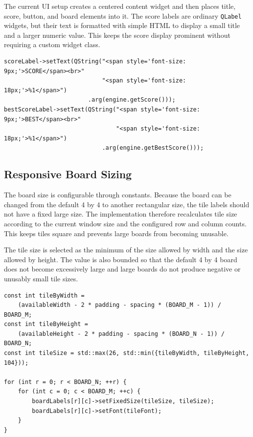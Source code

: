 \documentclass[a4paper,12pt]{article}
\begin{document}
The current UI setup creates a centered content widget and then places title, score, button, and board elements into it. The score labels are ordinary \texttt{QLabel} widgets, but their text is formatted with simple HTML to display a small title and a larger numeric value. This keeps the score display prominent without requiring a custom widget class.

\begin{lstlisting}[style=CppStyle,caption={Score label update}]
scoreLabel->setText(QString("<span style='font-size: 9px;'>SCORE</span><br>"
                            "<span style='font-size: 18px;'>%1</span>")
                        .arg(engine.getScore()));
bestScoreLabel->setText(QString("<span style='font-size: 9px;'>BEST</span><br>"
                                "<span style='font-size: 18px;'>%1</span>")
                            .arg(engine.getBestScore()));
\end{lstlisting}

\subsection*{Responsive Board Sizing}

The board size is configurable through constants. Because the board can be changed from the default 4 by 4 to another rectangular size, the tile labels should not have a fixed large size. The implementation therefore recalculates tile size according to the current window size and the configured row and column counts. This keeps tiles square and prevents large boards from becoming unusable.

The tile size is selected as the minimum of the size allowed by width and the size allowed by height. The value is also bounded so that the default 4 by 4 board does not become excessively large and large boards do not produce negative or unusably small tile sizes.

\begin{lstlisting}[style=CppStyle,caption={Dynamic square tile sizing}]
const int tileByWidth =
    (availableWidth - 2 * padding - spacing * (BOARD_M - 1)) / BOARD_M;
const int tileByHeight =
    (availableHeight - 2 * padding - spacing * (BOARD_N - 1)) / BOARD_N;
const int tileSize = std::max(26, std::min({tileByWidth, tileByHeight, 104}));

for (int r = 0; r < BOARD_N; ++r) {
    for (int c = 0; c < BOARD_M; ++c) {
        boardLabels[r][c]->setFixedSize(tileSize, tileSize);
        boardLabels[r][c]->setFont(tileFont);
    }
}
\end{lstlisting}
\end{document}
